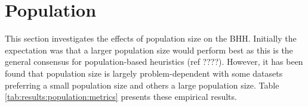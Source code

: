 \section{Population}
\label{sec:results:population}

This section investigates the effects of population size on the \Ac{BHH}. Initially the expectation was that a larger population size would perform best as this is the general consensus for population-based heuristics (ref ????). However, it has been found that population size is largely problem-dependent with some datasets preferring a small population size and others a large population size. Table \ref{tab:results:population:metrics} presents these empirical results.

\begin{table}[htbp]
	\centering
	\caption{Empirical results showcasing rank statistics for different population size values used by the \acs{BHH} across multiple datasets}
	\label{tab:results:population:metrics}%
	\par\bigskip
\end{table}
